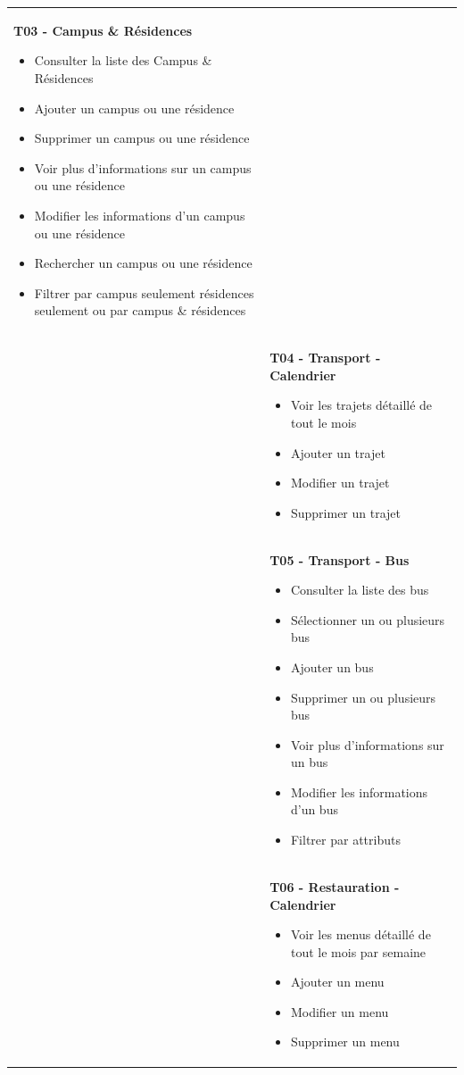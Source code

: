 \begin{longtable}{|Z{3cm}|L{10cm}|}
    \textbf{T03 - Campus \& Résidences}
    \begin{itemize}
        \item Consulter la liste des Campus \& Résidences
        \item Ajouter un campus ou une résidence
        \item Supprimer un campus ou une résidence
        \item Voir plus d'informations sur un campus ou une résidence
        \item Modifier les informations d'un campus ou une résidence
        \item Rechercher un campus ou une résidence
        \item Filtrer par campus seulement résidences seulement ou par campus \& résidences
    \end{itemize}\\
    &
    \textbf{T04 - Transport - Calendrier}
    \begin{itemize}
        \item Voir les trajets détaillé de tout le mois
        \item Ajouter un trajet
        \item Modifier un trajet
        \item Supprimer un trajet
    \end{itemize}\\
    &
    \textbf{T05 - Transport - Bus}
    \begin{itemize}
        \item Consulter la liste des bus
        \item Sélectionner un ou plusieurs bus
        \item Ajouter un bus
        \item Supprimer un ou plusieurs bus
        \item Voir plus d'informations sur un bus
        \item Modifier les informations d'un bus
        \item Filtrer par attributs
    \end{itemize}\\
    &
    \textbf{T06 - Restauration - Calendrier}
    \begin{itemize}
        \item Voir les menus détaillé de tout le mois par semaine
        \item Ajouter un menu
        \item Modifier un menu
        \item Supprimer un menu

\end{itemize}
\end{longtable}
